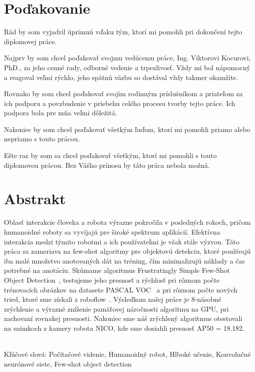 \documentclass[12pt, a4paper, oneside]{book}
\begin{document}
\chapter*{Poďakovanie}\label{chap:thank_you}
Rád by som vyjadril úprimnú vďaku tým, ktorí mi pomohli pri dokončení tejto diplomovej práce.

Najprv by som chcel poďakovať svojmu vedúcemu práce, Ing. Viktorovi Kocurovi, PhD., za jeho cenné rady, odborné vedenie a trpezlivosť. Vždy mi bol nápomocný a reagoval veľmi rýchlo, jeho spätnú väzbu so dostával vždy takmer okamžite. 

Rovnako by som chcel poďakovať svojim rodinným príslušníkom a priateľom za ich  podporu a povzbudenie v priebehu celého procesu tvorby tejto práce. Ich podpora bola pre mňa veľmi dôležitá.

Nakoniec by som chcel poďakovať všetkým ľuďom, ktorí mi pomohli priamo alebo nepriamo s touto prácou.

Ešte raz by som sa chcel poďakovať všetkým, ktorí mi pomohli s touto diplomovou prácou. Bez Vášho prínosu by táto práca nebola možná.

\vfill\eject 

\chapter*{Abstrakt}\label{chap:abstract_sk}

Oblasť interakcie človeka a robota výrazne pokročila v posledných rokoch, pričom humanoidné roboty sa vyvíjajú pre široké spektrum aplikácií. Efektívna interakcia medzi týmito robotmi a ich používateľmi je však stále výzvou. Táto práca sa zameriava na few-shot algoritmy pre objektovú detekciu, ktoré používajú iba malé množstvo anotovaných dát na tréning, čím minimalizujú náklady a čas potrebné na anotáciu. Skúmame algoritmus Frustratingly Simple Few-Shot Object Detection~\cite{FSFSODT}, testujeme jeho presnosť a rýchlosť pri rôznom počte trénovacích obrázkov na datasete PASCAL VOC~\cite{VOC} a pri rôznom počte nových tried, ktoré sme získali z roboflow~\cite{roboflow}. Výsledkom našej práce je 8-násobné zrýchlenie a výrazné zníženie pamäťovej náročnosti algoritmu na GPU, pri zachovaní rovnakej presnosti. Nakoniec sme náš zrýchlený algoritmus otestovali na snímkoch z kamery robota NICO, kde sme dosiahli presnosť AP50 = 18.182.

~\\
Kľúčové slová: Počítačové videnie, Humanoidný robot, Hlboké učenie, Konvolučné neurónové siete, Few-shot object detection 
\vfill\eject 
\end{document}
